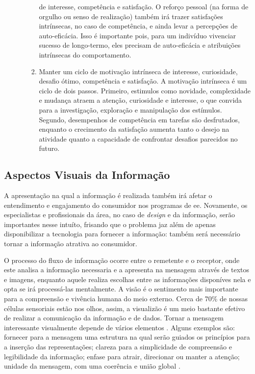 \begin{itemize}
\begin{enumerate}
\begin{enumerate}
de interesse, competência e satisfação. O reforço pessoal (na forma de orgulho
ou senso de realização) também irá trazer satisfações intrínsecas, no caso de
competência, e ainda levar a percepções de auto-eficácia. Isso é
importante pois, para um indivíduo vivenciar sucesso de longo-termo, eles
precisam de auto-eficácia e atribuições intrínsecas do comportamento.
\item Manter um ciclo de motivação intrínseca de interesse, curiosidade, desafio
ótimo, competência e satisfação. A motivação intrínseca é um ciclo de dois
passos. Primeiro, estimulos como novidade, complexidade e mudança atraem a
atenção, curiosidade e interesse, o que convida para a investigação, exploração
e manipulação dos estímulos. Segundo, desempenhos de competência em tarefas são
desfrutados, enquanto o crecimento da satisfação aumenta tanto o desejo na
atividade quanto a capacidade de confrontar desafios parecidos no futuro. 
\end{enumerate}
\end{enumerate}
\end{itemize}

\subsection{Aspectos Visuais da Informação}
\label{ssec:asp_visuais}

A apresentação na qual a informação é realizada também irá afetar o entendimento
e engajamento do consumidor nos programas de \gls{ee}. Novamente, os especialistas
e profissionais da área, no caso de \emph{design} e da informação,
serão importantes nesse intuíto, frisando que o problema jaz além de
apenas disponibilizar a tecnologia para fornecer a informação: também
será necessário tornar a informação atrativa ao consumidor.

O processo do fluxo de informação ocorre entre o remetente e o receptor, onde
este analisa a informação necessaria e a apresenta na mensagem através de textos
e imagens, enquanto aquele realiza escolhas entre as informações disponíves nela
e opta se irá processá-las mentalmente. A visão é o sentimento mais 
importante para a compreensão e vivência humana do meio externo. 
Cerca de 70\% de nossas células sensoriais estão nos olhos, assim, a visualizão 
é um meio bastante efetivo de realizar a comunicação da informação e de dados. 
Tornar a mensagem interessante visualmente depende de vários elementos 
\cite{2012_visualisation_sweden}. Alguns exemplos são: fornecer para a 
mensagem uma estrutura na qual serão guiados os princípios para
a inserção das representações; clareza para a simplicidade de compreensão e
legibilidade da informação; enfase para atrair, direcionar ou manter a atenção;
unidade da mensagem, com uma coerência e união global \cite{it_depends}.

